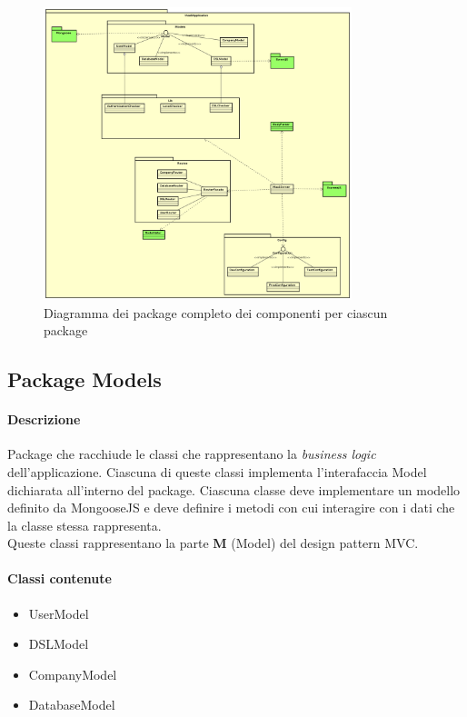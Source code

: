 \begin{figure}[H]
\centering
\includegraphics[width=0.8\textwidth]{res/sections/backend/collegamenti.png}
\caption{Diagramma dei package completo dei componenti per ciascun package}
\end{figure}

\subsection{Package Models}
\paragraph*{Descrizione}
Package che racchiude le classi che rappresentano la \textit{business logic} dell'applicazione. Ciascuna di queste classi implementa l'interafaccia Model dichiarata all'interno del package.
Ciascuna classe deve implementare un modello definito da MongooseJS e deve definire i metodi con cui interagire con i dati che la classe stessa rappresenta. \\
Queste classi rappresentano la parte \textbf{M} (Model) del design pattern MVC.

\paragraph*{Classi contenute}
\begin{itemize}
\item UserModel
\item DSLModel
\item CompanyModel
\item DatabaseModel
\end{itemize}

